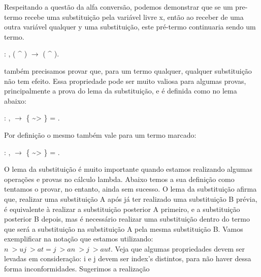 Respeitando a questão da alfa conversão, podemos demonstrar que se um pre-termo recebe uma substituição pela variável livre x, 
 então ao receber de uma outra variável qualquer y uma substituição, este pré-termo continuaria sendo um termo.\begin{coqdoccode}
\coqdocemptyline
\coqdocnoindent
{} : \coqdockw{\ensuremath{\forall}}   ,  ( \^{} ) \ensuremath{\rightarrow}  ( \^{} ).\coqdoceol
\coqdocemptyline
\coqdocemptyline
\coqdocemptyline
\coqdocemptyline
\coqdocemptyline
\coqdocemptyline
\end{coqdoccode}
também precisamos provar que, para um termo qualquer, qualquer substituição não tem efeito. Essa propriedade pode 
ser muito valiosa para algumas provas, principalmente a prova do lema da substituição, e é definida como no lema abaixo:\begin{coqdoccode}
\coqdocemptyline
\coqdocnoindent
{} : \coqdockw{\ensuremath{\forall}}   ,   \ensuremath{\rightarrow} \{ \~{}> \}  = .\coqdoceol
\coqdocemptyline
\end{coqdoccode}
Por definição o mesmo também vale para um termo marcado: \begin{coqdoccode}
\coqdocemptyline
\coqdocnoindent
{} : \coqdockw{\ensuremath{\forall}}   ,   \ensuremath{\rightarrow} \{ \~{}> \}  = .\coqdoceol
\coqdocemptyline
\coqdocemptyline
\coqdocemptyline
\end{coqdoccode}
O lema da substituição é muito importante quando estamos realizando algumas operações e provas no cálculo lambda. Abaixo temos
a sua definição como tentamos o provar, no entanto, ainda sem sucesso. O lema da substituição afirma que, realizar uma substituição A
após já ter realizado uma substituição B prévia, é equivalente à realizar a substituição posterior A primeiro, e a substituição posterior B
depois, mas é necessário realizar uma substituição dentro do termo que será a substituição na substituição A pela mesma substituição
B. Vamos exemplificar na notação que estamos utilizando: $ {n ~> u}{j ~> a} t = {j ~> a} {n ~> {j ~> a} u} t $. Veja que algumas propriedades
devem ser levadas em consideração: i e j devem ser index's distintos, para não haver dessa forma inconformidades. Sugerimos a realização 

